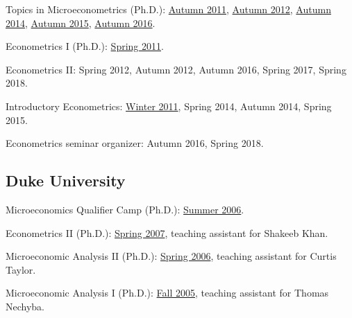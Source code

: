 \documentclass[10pt,letterpaper]{article}
\renewenvironment{itemize}{
  \begin{list}{}{
      \setlength{\leftmargin}{1.5em}
      \setlength{\itemsep}{0.25em}
      \setlength{\parskip}{0pt}
      \setlength{\parsep}{0.25em}
    }
}{
  \end{list}
}
\begin{document}
\begin{itemize}
\item Topics in Microeconometrics (Ph.D.):
  \href{https://jblevins.org/courses/econ843f11/}{Autumn 2011}, %
  \href{https://jblevins.org/courses/econ8833f12/}{Autumn 2012}, %
  \href{https://jblevins.org/courses/econ8833f14/}{Autumn 2014}, %
  \href{https://jblevins.org/courses/econ8833f15/}{Autumn 2015}, %
  \href{https://jblevins.org/courses/econ8833f16/}{Autumn 2016}. %
\item Econometrics I (Ph.D.):
  \href{https://jblevins.org/courses/econ741s11/}{Spring 2011}. %
\item Econometrics II:
  Spring 2012, %
  Autumn 2012, %
  Autumn 2016, %
  Spring 2017, %
  Spring 2018. %
\item Introductory Econometrics:
  \href{https://jblevins.org/courses/econ444w11/}{Winter 2011}, %
  Spring 2014, %
  Autumn 2014, %
  Spring 2015. %
\item Econometrics seminar organizer:
  Autumn 2016, Spring 2018.
\end{itemize}

\subsection*{Duke University}

\begin{itemize}
\item Microeconomics Qualifier Camp (Ph.D.):
  \href{https://jblevins.org/courses/qualcamp06/}{Summer 2006}.
\item Econometrics II (Ph.D.):
  \href{https://jblevins.org/courses/econ342s07/}{Spring 2007}, teaching assistant for Shakeeb Khan.
\item Microeconomic Analysis II (Ph.D.):
  \href{https://jblevins.org/courses/econ302s06/}{Spring 2006}, teaching assistant for Curtis Taylor.
\item Microeconomic Analysis I (Ph.D.):
  \href{https://jblevins.org/courses/econ301f05/}{Fall 2005}, teaching assistant for Thomas Nechyba.
\end{itemize}
\end{document}
